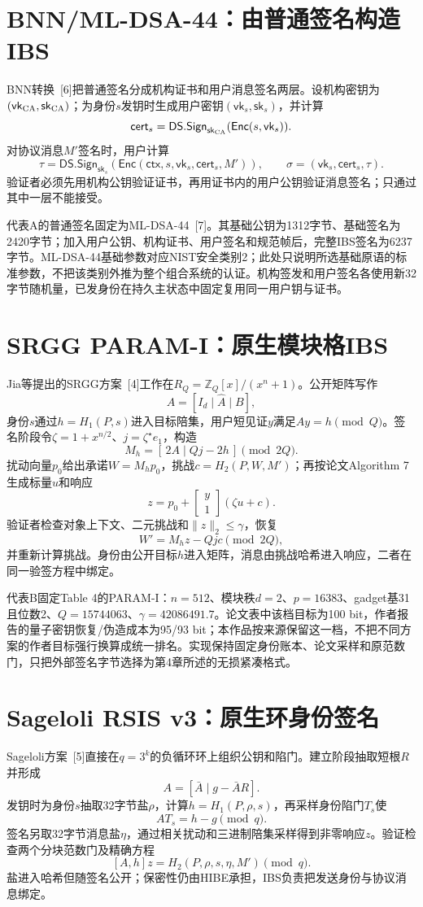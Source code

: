 \documentclass[UTF8,a4paper,12pt,oneside,openany,fontset=fandol]{ctexrep}
\begin{document}
\section{BNN/ML-DSA-44：由普通签名构造IBS}
BNN转换~[6]把普通签名分成机构证书和用户消息签名两层。设机构密钥为$(\mathsf{vk}_{\rm CA},\mathsf{sk}_{\rm CA})$；为身份$s$发钥时生成用户密钥$(\mathsf{vk}_s,\mathsf{sk}_s)$，并计算
\[
  \mathsf{cert}_s=\mathsf{DS.Sign}_{\mathsf{sk}_{\rm CA}}
       (\mathsf{Enc}(s,\mathsf{vk}_s)).
\]
对协议消息$M'$签名时，用户计算
\[
  \tau=\mathsf{DS.Sign}_{\mathsf{sk}_s}
       (\mathsf{Enc}(\mathsf{ctx},s,\mathsf{vk}_s,\mathsf{cert}_s,M')),
  \qquad
  \sigma=(\mathsf{vk}_s,\mathsf{cert}_s,\tau).
\]
验证者必须先用机构公钥验证证书，再用证书内的用户公钥验证消息签名；只通过其中一层不能接受。

代表A的普通签名固定为ML-DSA-44~[7]。其基础公钥为1312字节、基础签名为2420字节；加入用户公钥、机构证书、用户签名和规范帧后，完整IBS签名为6237字节。ML-DSA-44基础参数对应NIST安全类别2；此处只说明所选基础原语的标准参数，不把该类别外推为整个组合系统的认证。机构签发和用户签名各使用新32字节随机量，已发身份在持久主状态中固定复用同一用户钥与证书。

\section{SRGG PARAM-I：原生模块格IBS}
Jia等提出的SRGG方案~[4]工作在$R_Q=\mathbb Z_Q[x]/(x^n+1)$。公开矩阵写作
\[
  A=[I_d\mid \widehat A\mid B],
\]
身份$s$通过$h=H_1(P,s)$进入目标陪集，用户短见证$y$满足$Ay=h\pmod Q$。签名阶段令$\zeta=1+x^{n/2}$、$j=\zeta^\star e_1$，构造
\[
  M_h=[\,2A\mid Qj-2h\,]\pmod {2Q}.
\]
扰动向量$p_0$给出承诺$W=M_hp_0$，挑战$c=H_2(P,W,M')$；再按论文Algorithm 7生成标量$u$和响应
\[
  z=p_0+\begin{bmatrix}y\\1\end{bmatrix}(\zeta u+c).
\]
验证者检查对象上下文、二元挑战和$\lVert z\rVert_2\leq\gamma$，恢复
\[
  W'=M_hz-Qjc\pmod {2Q},
\]
并重新计算挑战。身份由公开目标$h$进入矩阵，消息由挑战哈希进入响应，二者在同一验签方程中绑定。

代表B固定Table 4的PARAM-I：$n=512$、模块秩$d=2$、$p=16383$、gadget基31且位数2、$Q=15744063$、$\gamma=42086491.7$。论文表中该档目标为100 bit，作者报告的量子密钥恢复/伪造成本为95/93 bit；本作品按来源保留这一档，不把不同方案的作者目标强行换算成统一排名。实现保持固定身份账本、论文采样和原范数门，只把外部签名字节选择为第4章所述的无损紧凑格式。

\section{Sageloli RSIS v3：原生环身份签名}
Sageloli方案~[5]直接在$q=3^k$的负循环环上组织公钥和陷门。建立阶段抽取短根$R$并形成
\[
  A=[\bar A\mid g-\bar A R].
\]
发钥时为身份$s$抽取32字节盐$\rho$，计算$h=H_1(P,\rho,s)$，再采样身份陷门$T_s$使
\[
  AT_s=h-g\pmod q.
\]
签名另取32字节消息盐$\eta$，通过相关扰动和三进制陪集采样得到非零响应$z$。验证检查两个分块范数门及精确方程
\[
  [A,h]z=H_2(P,\rho,s,\eta,M')\pmod q.
\]
盐进入哈希但随签名公开；保密性仍由HIBE承担，IBS负责把发送身份与协议消息绑定。
\end{document}
